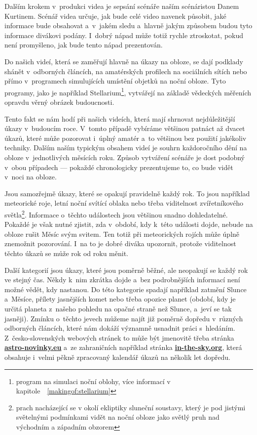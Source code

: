 \documentclass[12pt,a4paper,titlepage]{article}
\newcommand{\link}[2]{\href{#1}{\textcolor{link-color}{\textbf{#2}}}}%
\begin{document}
Dalším krokem v~produkci videa je sepsání scénáře naším scénáristou Danem Kurtinem. Scénář videa určuje, jak bude celé video navenek působit, jaké informace bude obsahovat a~v~jakém sledu a~hlavně jakým způsobem budou tyto informace divákovi podány. I~dobrý nápad může totiž rychle ztroskotat, pokud není promyšleno, jak bude tento nápad prezentován.

Do našich videí, která se zaměřují hlavně na úkazy na obloze, se dají podklady shánět v~odborných článcích, na amatérských profilech na sociálních sítích nebo přímo v~programech simulujících umístění objetků na noční obloze. Tyto programy, jako je například Stellarium\footnote{program na simulaci noční oblohy, více informací v kapitole~~\ref{makingof:stellarium}}, vytvářejí na základě vědeckých měřeních opravdu věrný obrázek budoucnosti. 

Tento fakt se nám hodí při našich videích, která mají shrnovat nejdůležitější úkazy v~budoucím roce. V~tomto případě vybíráme většinou patnáct až dvacet úkazů, které může pozorovat i~úplný amatér a~to většinou bez použití jakékoliv techniky. Dalším naším typickým obsahem videí je souhrn každoročního dění na obloze v~jednotlivých měsících roku. Způsob vytváření scénáře je dost podobný v~obou případech --- pokaždé chronologicky prezentujeme to, co bude vidět v~noci na obloze.

Jsou samozřejmě úkazy, které se opakují pravidelně každý rok. To jsou například meteorické roje, letní noční svítící oblaka nebo třeba viditelnost zvířetníkového světla\footnote{prach nacházející se v okolí ekliptiky sluneční soustavy, který je pod jistými světelnými podmínkami vidět na noční obloze jako světlý pruh nad východním a západním obzorem}. Informace o~těchto událostech jsou většinou snadno dohledatelné. Pokaždé je však nutné zjistit, zda v~období, kdy k~této události dojde, nebude na obloze rušit Měsíc svým svitem. Ten totiž při meteorických rojích může úplně znemožnit pozorování. I~na to je dobré diváka upozornit, protože viditelnost těchto úkazů se může rok od roku měnit.

Další kategorií jsou úkazy, které jsou poměrně běžné, ale neopakují se každý rok ve stejný čas. Někdy k~nim zkrátka dojde a~bez podrobnějších informací není možné vědět, kdy nastanou. Do této kategorie spadají například zatmění Slunce a~Měsíce, přílety jasnějších komet nebo třeba opozice planet (období, kdy je určitá planeta z~našeho pohledu na opačné straně než Slunce, a~jeví se tak jasněji). Zmínku o~těchto jevech můžeme najít již poměrně dopředu v~různých odborných článcích, které nám dokáží významně usnadnit práci s~hledáním. Z~česko-slovenských webových stránek to může být jmenovitě třeba stránka \link{https://www.astro-novinky.eu}{astro-novinky.eu} a~ze zahraničních například stránka \link{https://in-the-sky.org}{in-the-sky.org}, která obsahuje i~velmi pěkně zpracovaný kalendář úkazů na několik let dopředu.
\end{document}
